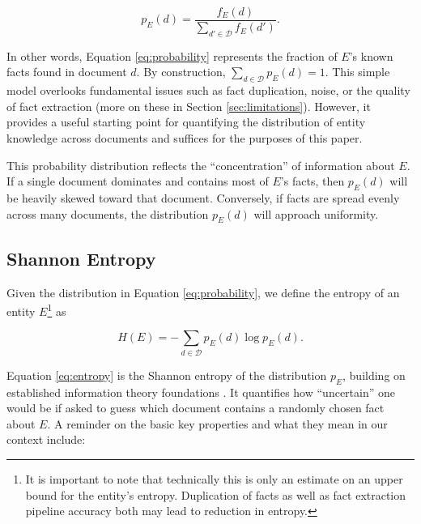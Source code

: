\documentclass[11pt,a4paper]{article}
\begin{document}
\begin{equation} \label{eq:probability}
p_{E}(d) = \frac{f_{E}(d)}{\sum\limits_{d' \in \mathcal{D}} f_{E}(d')}.
\end{equation}

\noindent In other words, Equation \ref{eq:probability} represents the fraction of $E$'s known facts found in document $d$. By construction, $\sum_{d \in \mathcal{D}} p_{E}(d) = 1$. This simple model overlooks fundamental issues such as fact duplication, noise, or the quality of fact extraction (more on these in Section \ref{sec:limitations}). However, it provides a useful starting point for quantifying the distribution of entity knowledge across documents and suffices for the purposes of this paper.

This probability distribution reflects the ``concentration'' of information about $E$. If a single document dominates and contains most of $E$'s facts, then $p_{E}(d)$ will be heavily skewed toward that document. Conversely, if facts are spread evenly across many documents, the distribution $p_{E}(d)$ will approach uniformity.

\subsection{Shannon Entropy}

Given the distribution in Equation \ref{eq:probability}, we define the entropy of an entity $E$\footnote{It is important to note that technically this is only an estimate on an upper bound for the entity's entropy. Duplication of facts as well as fact extraction pipeline accuracy both may lead to reduction in entropy.} as

\begin{equation} \label{eq:entropy}
H(E) = -\sum_{d \in \mathcal{D}} p_{E}(d) \log p_{E}(d).
\end{equation}

Equation \ref{eq:entropy} is the Shannon entropy of the distribution $p_{E}$, building on established information theory foundations \cite{cover1991elements}. It quantifies how ``uncertain'' one would be if asked to guess which document contains a randomly chosen fact about $E$. A reminder on the basic key properties and what they mean in our context include:
\end{document}
